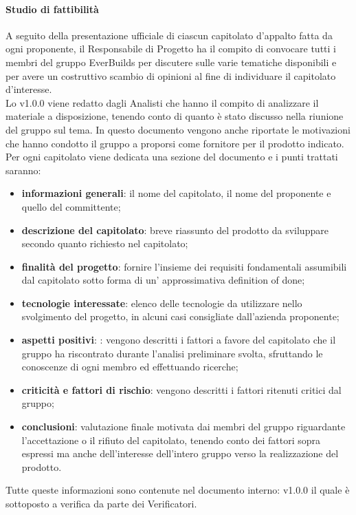             \paragraph{Studio di fattibilità}
                A seguito della presentazione ufficiale di ciascun capitolato d’appalto fatta da ogni proponente, il Responsabile di Progetto ha il compito di convocare tutti i membri del gruppo EverBuilds per discutere sulle varie tematiche disponibili e per avere un costruttivo scambio di opinioni al fine di individuare il capitolato d’interesse. \\
                Lo  v1.0.0 viene redatto dagli Analisti che hanno il compito di analizzare il materiale a disposizione, tenendo conto di quanto è stato discusso nella riunione del gruppo sul tema. In questo documento vengono anche riportate le motivazioni che hanno condotto il gruppo a proporsi come fornitore per il prodotto indicato.\\
                Per ogni capitolato viene dedicata una sezione del documento e i punti trattati saranno:\\
                \begin{itemize}
                    \item\textbf{informazioni generali}: il nome del capitolato, il nome del proponente e quello del committente; 
                    \item\textbf{descrizione del capitolato}: breve riassunto del prodotto da sviluppare secondo quanto richiesto nel capitolato; 
                    \item\textbf{finalità del progetto}: fornire l’insieme dei requisiti fondamentali assumibili dal capitolato sotto forma di un’ approssimativa definition of done; 
                    \item\textbf{tecnologie interessate}: elenco delle tecnologie da utilizzare nello svolgimento del progetto, in alcuni casi consigliate dall’azienda proponente; 
                    \item\textbf{aspetti positivi}: : vengono descritti i fattori a favore del capitolato che il gruppo ha riscontrato durante l’analisi preliminare svolta, sfruttando le conoscenze di ogni membro ed effettuando ricerche;
                    \item\textbf{criticità e fattori di rischio}: vengono descritti i fattori ritenuti critici dal gruppo; 
                    \item\textbf{conclusioni}: valutazione finale motivata dai membri del gruppo riguardante l’accettazione o il rifiuto del capitolato, tenendo conto dei fattori sopra espressi ma anche dell’interesse dell’intero gruppo verso la realizzazione del prodotto.
                \end{itemize}
                Tutte queste informazioni sono contenute nel documento interno:  v1.0.0 il quale è sottoposto a verifica da parte dei Verificatori.\\
